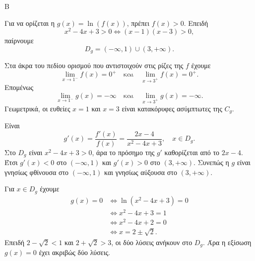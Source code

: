 \begin{thema}{Β}
\begin{erwthma}
\item Για να ορίζεται η $g(x)=\ln(f(x))$, πρέπει $f(x)>0$. Επειδή
\[
x^2-4x+3>0\Leftrightarrow (x-1)(x-3)>0,
\]
παίρνουμε
\[
D_g=(-\infty,1)\cup(3,+\infty).
\]

\item Στα άκρα του πεδίου ορισμού που αντιστοιχούν στις ρίζες της $f$ έχουμε
\[
\lim_{x\to1^-}f(x)=0^+\quad \text{και}\quad \lim_{x\to3^+}f(x)=0^+.
\]
Επομένως
\[
\lim_{x\to1^-}g(x)=-\infty\quad \text{και}\quad \lim_{x\to3^+}g(x)=-\infty.
\]
Γεωμετρικά, οι ευθείες $x=1$ και $x=3$ είναι κατακόρυφες ασύμπτωτες της $C_g$.

\item Είναι
\[
g'(x)=\frac{f'(x)}{f(x)}=\frac{2x-4}{x^2-4x+3},\quad x\in D_g.
\]
Στο $D_g$ είναι $x^2-4x+3>0$, άρα το πρόσημο της $g'$ καθορίζεται από το $2x-4$. Έτσι $g'(x)<0$ στο $(-\infty,1)$ και $g'(x)>0$ στο $(3,+\infty)$. Συνεπώς η $g$ είναι γνησίως φθίνουσα στο $(-\infty,1)$ και γνησίως αύξουσα στο $(3,+\infty)$.

\item Για $x\in D_g$ έχουμε
\begin{align*}
g(x)=0
&\Leftrightarrow \ln(x^2-4x+3)=0\\
&\Leftrightarrow x^2-4x+3=1\\
&\Leftrightarrow x^2-4x+2=0\\
&\Leftrightarrow x=2\pm\sqrt2.
\end{align*}
Επειδή $2-\sqrt2<1$ και $2+\sqrt2>3$, οι δύο λύσεις ανήκουν στο $D_g$. Άρα η εξίσωση $g(x)=0$ έχει ακριβώς δύο λύσεις.
\end{erwthma}
\end{thema}


